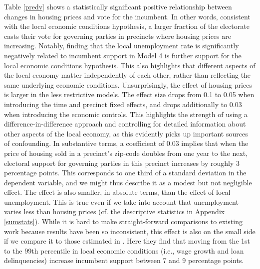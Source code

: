 \documentclass[12pt,a4paper]{article}
\begin{document}
	Table \ref{predv} shows a statistically significant positive relationship between changes in housing prices and vote for the incumbent. In other words, consistent with the local economic conditions hypothesis, a larger fraction of the electorate casts their vote for governing parties in precincts where housing prices are increasing. 
	Notably, finding that the local unemployment rate is significantly negatively related to incumbent support in Model 4 is further support for the local economic conditions hypothesis. This also highlights that different aspects of the local economy matter independently of each other, rather than reflecting the same underlying economic conditions.
	Unsurprisingly, the effect of housing prices is larger in the less restrictive models. The effect size drops from 0.1 to 0.05 when introducing the time and precinct fixed effects, and drops additionally to 0.03 when introducing the economic controls. This highlights the strength of using a difference-in-difference approach and controlling for detailed information about other aspects of the local economy, as this evidently picks up important sources of confounding. In substantive terms, a coefficient of 0.03 implies that when the price of housing sold in a precinct's zip-code doubles from one year to the next, electoral support for governing parties in this precinct increases by roughly 3 percentage points. This corresponds to one third of a standard deviation in the dependent variable, and we might thus describe it as a modest but not negligible effect. The effect is also smaller, in absolute terms, than the effect of local unemployment. This is true even if we take into account that unemployment varies less than housing prices (cf. the descriptive statistics in Appendix \ref{sumstats}).  While it is hard to make straight-forward comparisons to existing work because results have been so inconsistent, this effect is also on the small side if we compare it to those estimated in \cite{healy2017presidential}. Here they find that moving from the 1st to the 99th percentile in local economic conditions (i.e., wage growth and loan delinquencies) increase incumbent support between 7 and 9 percentage points.
\end{document}
